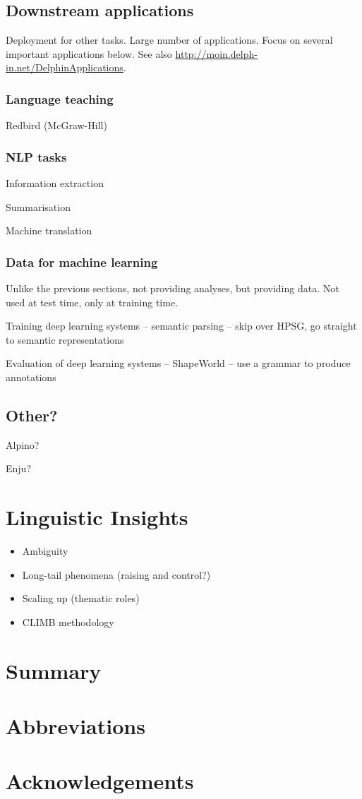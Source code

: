 \documentclass[output=paper,nonflat]{langsci/langscibook}
\begin{document}
\subsection{Downstream applications}
\label{cl:downstream}

Deployment for other tasks.
Large number of applications.
Focus on several important applications below.
See also \url{http://moin.delph-in.net/DelphinApplications}.


\subsubsection{Language teaching}

Redbird (McGraw-Hill)


\subsubsection{NLP tasks}

Information extraction

Summarisation

Machine translation



\subsubsection{Data for machine learning}

Unlike the previous sections,
not providing analyses, but providing data.
Not used at test time, only at training time.

Training deep learning systems
-- semantic parsing
-- skip over HPSG, go straight to semantic representations

Evaluation of deep learning systems
-- ShapeWorld
-- use a grammar to produce annotations


\subsection{Other?}

Alpino?

Enju?



\section{Linguistic Insights}
\label{cl:insight}

\begin{itemize}
    \item Ambiguity %
    \item Long-tail phenomena (raising and control?) %
    \item Scaling up (thematic roles) %
    \item CLIMB methodology %
\end{itemize}

\section{Summary}

\section*{Abbreviations}
\section*{Acknowledgements}

\printbibliography[heading=subbibliography,notkeyword=this] 
\end{document}
